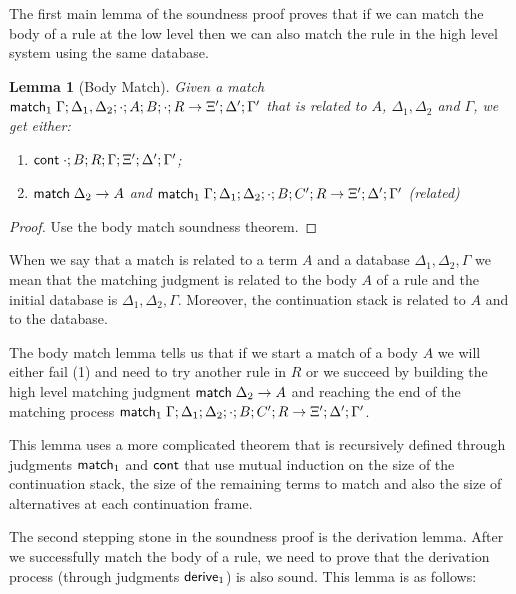 The first main lemma of the soundness proof proves that if we can match the body
of a rule at the low level then we can also match the rule in the high level system using the same database.

\newtheorem{theorem}{Theorem}
\newtheorem{lemma}{Lemma}

\begin{lemma}[Body Match]
   Given a match $\mathsf{match}_1 \; \Gamma; \Delta_1, \Delta_2; \cdot; A; B; \cdot; R \rightarrow \Xi'; \Delta'; \Gamma'$ that is related to $A$, $\Delta_1, \Delta_2$ and $\Gamma$, we get either:
   
   \begin{enumerate}
      \item $\mathsf{cont} \; \cdot; B; R; \Gamma; \Xi'; \Delta'; \Gamma'$;
      \item $\mathsf{match} \; \Delta_2 \rightarrow A$ and $\mathsf{match}_1 \; \Gamma; \Delta_1; \Delta_2; \cdot; B; C'; R \rightarrow \Xi'; \Delta'; \Gamma'$ (related)
   \end{enumerate}
\end{lemma}
\begin{proof}
   Use the body match soundness theorem.
\end{proof}

When we say that a match is related to a term $A$ and a database $\Delta_1, \Delta_2, \Gamma$ we mean that
the matching judgment is related to the body $A$ of a rule and the initial database is $\Delta_1, \Delta_2, \Gamma$. Moreover, the continuation stack is related to $A$ and to the database.

The body match lemma tells us that if we start a match of a body $A$ we will either fail (1) and need to try another rule in $R$ or we succeed by building the high level matching judgment $\mathsf{match} \; \Delta_2 \rightarrow A$ and reaching the end of the matching process $\mathsf{match}_1 \; \Gamma; \Delta_1; \Delta_2; \cdot; B; C'; R \rightarrow \Xi'; \Delta'; \Gamma'$.

This lemma uses a more complicated theorem that is recursively defined through judgments $\mathsf{match}_1$ and $\mathsf{cont}$ that use mutual induction on the size of the continuation stack, the size of the remaining terms
 to match and also the size of alternatives at each continuation frame.
 
The second stepping stone in the soundness proof is the derivation lemma. After we successfully match the
body of a rule, we need to prove that the derivation process (through judgments $\mathsf{derive}_1$) is also
sound. This lemma is as follows:

